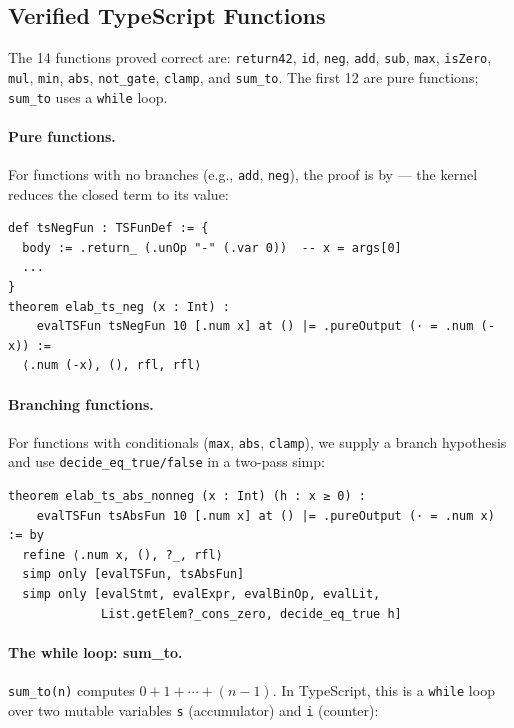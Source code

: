 \subsection{Verified TypeScript Functions}

The 14 functions proved correct are:
\texttt{return42}, \texttt{id}, \texttt{neg}, \texttt{add}, \texttt{sub},
\texttt{max}, \texttt{isZero}, \texttt{mul}, \texttt{min},
\texttt{abs}, \texttt{not\_gate}, \texttt{clamp}, and \texttt{sum\_to}.
The first 12 are pure functions; \texttt{sum\_to} uses a \texttt{while} loop.

\paragraph{Pure functions.}
For functions with no branches (e.g., \texttt{add}, \texttt{neg}), the proof
is by \rfl — the kernel reduces the closed term to its value:

\begin{lstlisting}[caption={T3: neg proved by rfl.},label={lst:tsneg}]
def tsNegFun : TSFunDef := {
  body := .return_ (.unOp "-" (.var 0))  -- x = args[0]
  ...
}
theorem elab_ts_neg (x : Int) :
    evalTSFun tsNegFun 10 [.num x] at () |= .pureOutput (· = .num (-x)) :=
  ⟨.num (-x), (), rfl, rfl⟩
\end{lstlisting}

\paragraph{Branching functions.}
For functions with conditionals (\texttt{max}, \texttt{abs}, \texttt{clamp}),
we supply a branch hypothesis and use \texttt{decide\_eq\_true/false}
in a two-pass simp:

\begin{lstlisting}[caption={T10: abs (x $\ge$ 0 branch).},label={lst:tsabs}]
theorem elab_ts_abs_nonneg (x : Int) (h : x ≥ 0) :
    evalTSFun tsAbsFun 10 [.num x] at () |= .pureOutput (· = .num x) := by
  refine ⟨.num x, (), ?_, rfl⟩
  simp only [evalTSFun, tsAbsFun]
  simp only [evalStmt, evalExpr, evalBinOp, evalLit,
             List.getElem?_cons_zero, decide_eq_true h]
\end{lstlisting}

\paragraph{The while loop: sum\_to.}
\texttt{sum\_to(n)} computes $0 + 1 + \cdots + (n-1)$.
In TypeScript, this is a \texttt{while} loop over two mutable variables
\texttt{s} (accumulator) and \texttt{i} (counter):

